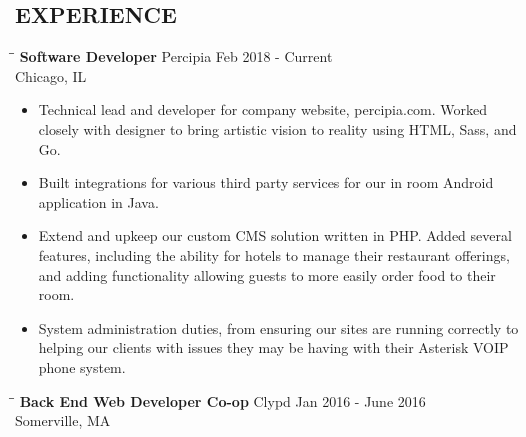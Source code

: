 \documentclass{res}
\begin{document}
 

\address{\bf  1611 W. Division st. Apt 1106 \\Chicago, IL 60622 \\(857) 407-8840 \\ ronbrz@protonmail.ch}

\begin{resume}
\section{EXPERIENCE}
\vspace{0in}
\begin{tabbing}
  \hspace{2.3in}\= \hspace{2.6in}\= \kill %
  {\bf Software Developer} \>Percipia     \> Feb 2018 - Current\\
  \>Chicago, IL
\end{tabbing}
\begin{itemize} \itemsep -2pt
\item Technical lead and developer for company website, percipia.com. Worked closely
  with designer to bring artistic vision to reality using HTML, Sass, and Go.
\item Built integrations for various third party services for our in room Android application in Java.
\item Extend and upkeep our custom CMS solution written in PHP. Added several features, including
  the ability for hotels to manage their restaurant offerings, and adding functionality allowing guests to
  more easily order food to their room.
\item System administration duties, from ensuring our sites are running correctly to helping our clients
  with issues they may be having with their Asterisk VOIP phone system.
\end{itemize}
\vspace{-.2in}
\begin{tabbing}
  \hspace{2.3in}\= \hspace{2.6in}\= \kill %
  {\bf Back End Web Developer Co-op} \>Clypd     \> Jan 2016 - June 2016\\
  \>Somerville, MA
\end{tabbing}
\begin{itemize} \itemsep -2pt

\end{itemize}
\end{resume}
\end{document}
